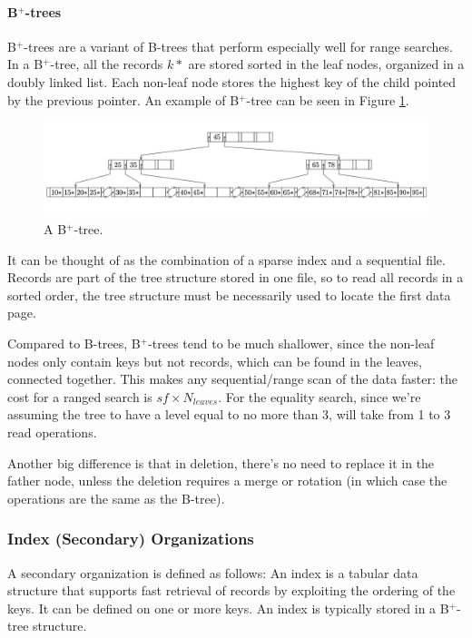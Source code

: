 \paragraph{B$^+$-trees}

B$^+$-trees are a variant of B-trees that perform especially well for range searches. In a B$^+$-tree, all the records $k*$ are stored sorted in the leaf nodes, organized in a doubly linked list. Each non-leaf node stores the highest key of the child pointed by the previous pointer. An example of B$^+$-tree can be seen in Figure \ref{fig:B+-tree}.

\begin{figure}[h]
    \centering
    \includegraphics[width=1\linewidth]{img/B+-tree.png}
    \caption{A B$^+$-tree.}
    \label{fig:B+-tree}
\end{figure}
It can be thought of as the combination of a sparse index and a sequential file. Records are part of the tree structure stored in one file, so to read all records in a sorted order, the tree structure must be necessarily used to locate the first data page.

Compared to B-trees, B$^+$-trees tend to be much shallower, since the non-leaf nodes only contain keys but not records, which can be found in the leaves, connected together. This makes any sequential/range scan of the data faster: the cost for a ranged search is $sf \times N_{leaves}$. For the equality search, since we're assuming the tree to have a level equal to no more than 3, will take from 1 to 3 read operations.

Another big difference is that in deletion, there's no need to replace it in the father node, unless the deletion requires a merge or rotation (in which case the operations are the same as the B-tree).

\subsubsection{Index (Secondary) Organizations}

A secondary organization is defined as follows:
An index is a tabular data structure that supports fast retrieval of records by exploiting the ordering of the keys. It can be defined on one or more keys. An index is typically stored in a B$^+$-tree structure.

